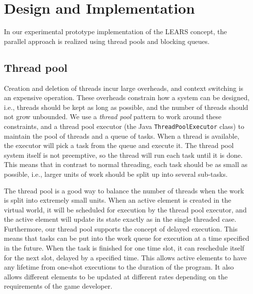 \section{Design and Implementation}\label{sec:implementation}


In our experimental prototype implementation of the LEARS concept, the
parallel approach is realized using thread pools and blocking queues.

\subsection{Thread pool}

Creation and deletion of threads incur large overheads,
and context switching is an expensive operation.  These overheads
constrain how a system can be designed, i.e., threads should be kept
as long as possible, and the number of threads should not grow
unbounded. We use a \textit{thread pool} pattern to work around these
constraints, and a thread pool executor (the Java
\texttt{ThreadPoolExecutor} class) to maintain the pool
of threads and a queue of tasks. When a thread is available, the
executor will pick a task from the queue and execute it. The thread
pool system itself is not preemptive, so the thread will run each task
until it is done. This means that in contrast to normal threading,
each task should be as small as possible, i.e., larger units of work should
be split up into several sub-tasks.

The thread pool is a good way to balance the number of threads
when the work is split into extremely small units. When an active
element is created in the virtual world, it will be scheduled for
execution by the thread pool executor, and the active element will
update its state exactly as in the single threaded case.
%
Furthermore, our thread pool supports the concept of delayed
execution. This means that tasks can be put into the work queue for
execution at a time specified in the future.
%
When the task is finished for one time slot, it can reschedule itself
for the next slot, delayed by a specified time. This allows active
elements to have any lifetime from one-shot executions to the duration
of the program. It also allows different elements to be updated at
different rates depending on the requirements of the game developer.


